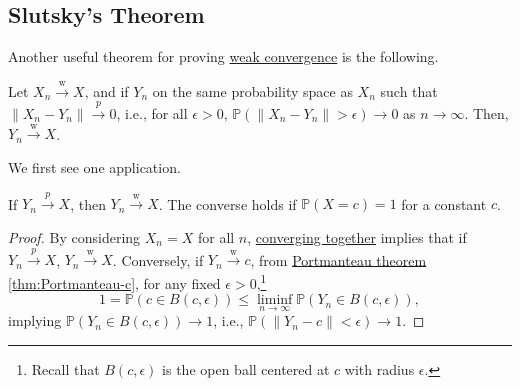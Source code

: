 \subsection{Slutsky's Theorem}
Another useful theorem for proving \hyperref[def:converge-weakly]{weak convergence} is the following.

\begin{theorem}\label{thm:converging-together}
	Let \(X_n \overset{\text{w} }{\to } X\), and if \(Y_n\) on the same probability space as \(X_n\) such that \(\lVert X_n - Y_n \rVert \overset{p}{\to } 0\), i.e., for all \(\epsilon > 0\), \(\mathbb{P} (\lVert X_n - Y_n \rVert > \epsilon ) \to 0\) as \(n \to \infty\). Then, \(Y_n \overset{\text{w} }{\to } X\).
\end{theorem}

We first see one application.

\begin{corollary}\label{col:weak-probability-constant}
	If \(Y_n \overset{p}{\to } X\), then \(Y_n \overset{\text{w} }{\to } X\). The converse holds if \(\mathbb{P} (X = c) = 1\) for a constant \(c\).
\end{corollary}
\begin{proof}
	By considering \(X_n = X\) for all \(n\), \hyperref[thm:converging-together]{converging together} implies that if \(Y_n \overset{p}{\to } X\), \(Y_n \overset{\text{w} }{\to } X\). Conversely, if \(Y_n \overset{\text{w} }{\to } c\), from \hyperref[thm:Portmanteau]{Portmanteau theorem} \autoref{thm:Portmanteau-c}, for any fixed \(\epsilon > 0\),\footnote{Recall that \(B(c, \epsilon )\) is the open ball centered at \(c\) with radius \(\epsilon \).}
	\[
		1
		= \mathbb{P} (c \in B(c, \epsilon ))
		\leq \liminf_{n \to \infty} \mathbb{P} (Y_n \in B(c, \epsilon )),
	\]
	implying \(\mathbb{P} (Y_n \in B(c, \epsilon )) \to 1\), i.e., \(\mathbb{P} (\lVert Y_n - c \rVert < \epsilon ) \to 1\).
\end{proof}